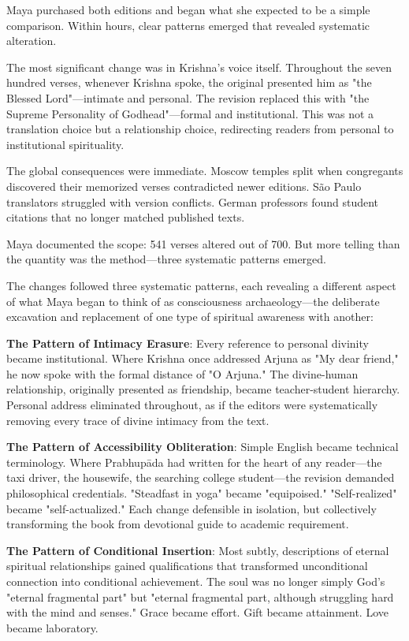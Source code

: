 \documentclass[11pt,twoside]{book}
\begin{document}
Maya purchased both editions and began what she expected to be a simple comparison. Within hours, clear patterns emerged that revealed systematic alteration.

The most significant change was in Krishna's voice itself. Throughout the seven hundred verses, whenever Krishna spoke, the original presented him as "the Blessed Lord"—intimate and personal. The revision replaced this with "the Supreme Personality of Godhead"—formal and institutional. This was not a translation choice but a relationship choice, redirecting readers from personal to institutional spirituality.

The global consequences were immediate. Moscow temples split when congregants discovered their memorized verses contradicted newer editions. São Paulo translators struggled with version conflicts. German professors found student citations that no longer matched published texts.

Maya documented the scope: 541 verses altered out of 700. But more telling than the quantity was the method—three systematic patterns emerged.

The changes followed three systematic patterns, each revealing a different aspect of what Maya began to think of as consciousness archaeology—the deliberate excavation and replacement of one type of spiritual awareness with another:

\textbf{\textbf{The Pattern of Intimacy Erasure}}: Every reference to personal divinity became institutional. Where Krishna once addressed Arjuna as "My dear friend," he now spoke with the formal distance of "O Arjuna." The divine-human relationship, originally presented as friendship, became teacher-student hierarchy. Personal address eliminated throughout, as if the editors were systematically removing every trace of divine intimacy from the text.

\textbf{\textbf{The Pattern of Accessibility Obliteration}}: Simple English became technical terminology. Where Prabhupāda had written for the heart of any reader—the taxi driver, the housewife, the searching college student—the revision demanded philosophical credentials. "Steadfast in yoga" became "equipoised." "Self-realized" became "self-actualized." Each change defensible in isolation, but collectively transforming the book from devotional guide to academic requirement.

\textbf{\textbf{The Pattern of Conditional Insertion}}: Most subtly, descriptions of eternal spiritual relationships gained qualifications that transformed unconditional connection into conditional achievement. The soul was no longer simply God's "eternal fragmental part" but "eternal fragmental part, although struggling hard with the mind and senses." Grace became effort. Gift became attainment. Love became laboratory.
\end{document}
